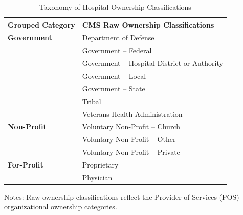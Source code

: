 
\begin{table}[htbp]
\centering
\caption{Taxonomy of Hospital Ownership Classifications}
\label{tab:ownership_mapping}

\renewcommand{\arraystretch}{1.15}

\begin{threeparttable}

\begin{tabular}{p{2.0in} p{4.2in}}
\toprule
\textbf{Grouped Category} &
\textbf{CMS Raw Ownership Classifications} \\
\midrule

\textbf{Government}
& Department of Defense \\
& Government -- Federal \\
& Government -- Hospital District or Authority \\
& Government -- Local \\
& Government -- State \\
& Tribal \\
& Veterans Health Administration \\
\midrule

\textbf{Non-Profit}
& Voluntary Non-Profit -- Church \\
& Voluntary Non-Profit -- Other \\
& Voluntary Non-Profit -- Private \\
\midrule

\textbf{For-Profit}
& Proprietary \\
& Physician \\
\bottomrule

\end{tabular}

\begin{tablenotes}[flushleft]
\footnotesize
\item Notes:
Raw ownership classifications reflect the Provider of Services
(POS) organizational ownership categories.
\end{tablenotes}

\end{threeparttable}
\end{table}
